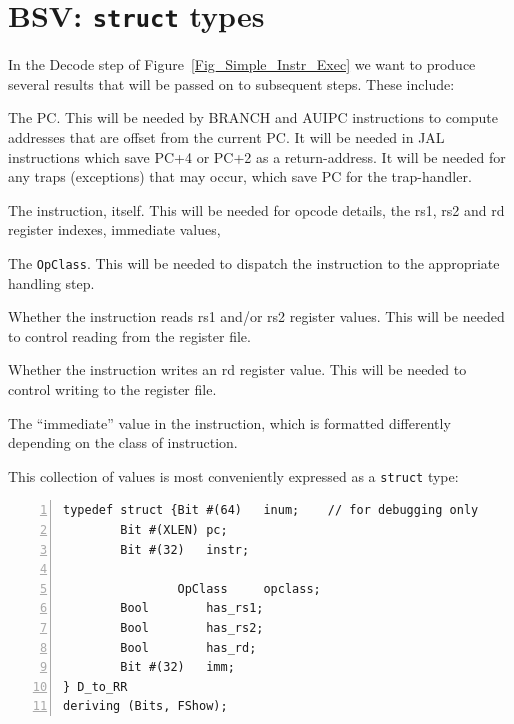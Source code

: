 
\section{BSV: {\tt struct} types}

\label{BSV_struct_types}


In the Decode step of Figure~\ref{Fig_Simple_Instr_Exec} we
want to produce several results that will be passed on to subsequent
steps.  These include:

\begin{tightlist}

\item The PC.  This will be needed by BRANCH and AUIPC instructions to
  compute addresses that are offset from the current PC.  It will be
  needed in JAL instructions which save PC+4 or PC+2 as a
  return-address.  It will be needed for any traps (exceptions) that
  may occur, which save PC for the trap-handler.

\item The instruction, itself.  This will be needed for opcode
  details, the rs1, rs2 and rd register indexes, immediate values,
  {\etc}

\item The \verb|OpClass|.  This will be needed to dispatch the
  instruction to the appropriate handling step.

\item Whether the instruction reads rs1 and/or rs2 register values.
  This will be needed to control reading from the register file.

\item Whether the instruction writes an rd register value.  This will
  be needed to control writing to the register file.

\item The ``immediate'' value in the instruction, which is formatted
  differently depending on the class of instruction.

\end{tightlist}

This collection of values is most conveniently expressed as a
\verb|struct| type:

\begin{Verbatim}[frame=single, numbers=left]
typedef struct {Bit #(64)   inum;    // for debugging only
		Bit #(XLEN) pc;
		Bit #(32)   instr;

                OpClass     opclass;
		Bool        has_rs1;
		Bool        has_rs2;
		Bool        has_rd;
		Bit #(32)   imm;
} D_to_RR
deriving (Bits, FShow);
\end{Verbatim}

